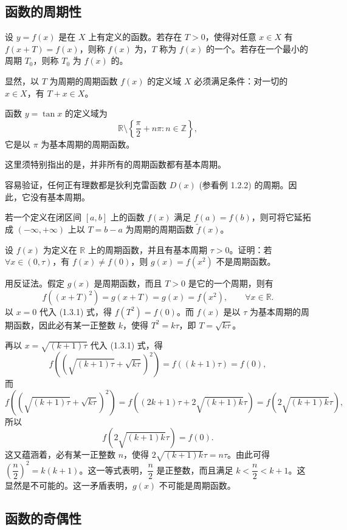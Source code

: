 \documentclass[UTF8,12pt,a4paper,fontset=fandol]{ctexbook}
\begin{document}
\subsection{函数的周期性}

设 $y=f(x)$ 是在 $X$ 上有定义的函数。若存在 $T>0$，使得对任意 $x\in X$ 有 $f(x+T)=f(x)$，则称 $f(x)$ 为，$T$ 称为 $f(x)$ 的一个。若存在一个最小的周期 $T_0$，则称 $T_0$ 为 $f(x)$ 的。

显然，以 $T$ 为周期的周期函数 $f(x)$ 的定义域 $X$ 必须满足条件：对一切的 $x\in X$，有 $T+x\in X$。

\noindent{}\quad 函数 $y=\tan x$ 的定义域为
\[
  \mathbb{R}\setminus\left\{\frac\pi2+n\pi:n\in\mathbb{Z}\right\},
\]
它是以 $\pi$ 为基本周期的周期函数。

这里须特别指出的是，并非所有的周期函数都有基本周期。

\noindent{}\quad 容易验证，任何正有理数都是狄利克雷函数 $D(x)$ (参看例 1.2.2) 的周期。因此，它没有基本周期。

若一个定义在闭区间 $[a,b]$ 上的函数 $f(x)$ 满足 $f(a)=f(b)$，则可将它延拓成 $(-\infty,+\infty)$ 上以 $T=b-a$ 为周期的周期函数 $\tilde f(x)$。

\noindent{}\quad 设 $f(x)$ 为定义在 $\mathbb{R}$ 上的周期函数，并且有基本周期 $\tau>0$。证明：若 $\forall x\in(0,\tau)$，有 $f(x)\ne f(0)$，则 $g(x)=f(x^2)$ 不是周期函数。

\noindent{}\quad 用反证法。假定 $g(x)$ 是周期函数，而且 $T>0$ 是它的一个周期，则有
\begin{equation}
  f((x+T)^2)=g(x+T)=g(x)=f(x^2),\qquad \forall x\in\mathbb{R}.
  \tag{1.3.1}
\end{equation}
以 $x=0$ 代入 (1.3.1) 式，得 $f(T^2)=f(0)$。而 $f(x)$ 是以 $\tau$ 为基本周期的周期函数，因此必有某一正整数 $k$，使得 $T^2=k\tau$，即 $T=\sqrt{k\tau}$。

再以 $x=\sqrt{(k+1)\tau}$ 代入 (1.3.1) 式，得
\[
  f\left(\left(\sqrt{(k+1)\tau}+\sqrt{k\tau}\right)^2\right)=f((k+1)\tau)=f(0),
\]
而
\[
  f\left(\left(\sqrt{(k+1)\tau}+\sqrt{k\tau}\right)^2\right)
  =f\left((2k+1)\tau+2\sqrt{(k+1)k}\tau\right)
  =f(2\sqrt{(k+1)k}\tau),
\]
所以
\[
  f(2\sqrt{(k+1)k}\tau)=f(0).
\]
这又蕴涵着，必有某一正整数 $n$，使得 $2\sqrt{(k+1)k}\tau=n\tau$。由此可得 $\left(\dfrac n2\right)^2=k(k+1)$。这一等式表明，$\dfrac n2$ 是正整数，而且满足 $k<\dfrac n2<k+1$。这显然是不可能的。这一矛盾表明，$g(x)$ 不可能是周期函数。

\subsection{函数的奇偶性}
\end{document}
